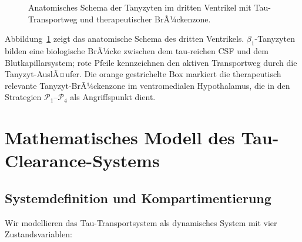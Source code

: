 ﻿\documentclass[12pt,a4paper]{article}
\theoremstyle{definition}
\begin{document}
\begin{figure}[H]
		\caption{Anatomisches Schema der Tanyzyten im dritten Ventrikel mit Tau-Transportweg und therapeutischer BrÃ¼ckenzone.}
		\label{fig:tanyzyt_anatomie}
	\end{figure}
	{\small Abbildung~\ref{fig:tanyzyt_anatomie} zeigt das anatomische Schema des dritten Ventrikels. $\beta_1$-Tanyzyten bilden eine biologische BrÃ¼cke zwischen dem tau-reichen CSF und dem Blutkapillarsystem; rote Pfeile kennzeichnen den aktiven Transportweg durch die Tanyzyt-AuslÃ¤ufer. Die orange gestrichelte Box markiert die therapeutisch relevante Tanyzyt-BrÃ¼ckenzone im ventromedialen Hypothalamus, die in den Strategien $\mathcal{P}_1$--$\mathcal{P}_4$ als Angriffspunkt dient.}
	
	\section{Mathematisches Modell des Tau-Clearance-Systems}
	
	\subsection{Systemdefinition und Kompartimentierung}
	
	Wir modellieren das Tau-Transportsystem als dynamisches System mit vier Zustandsvariablen:
	
\end{document}
